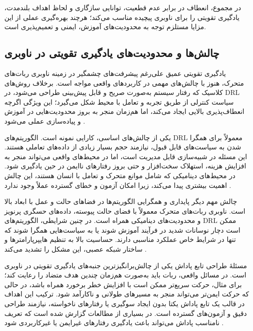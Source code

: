 در مجموع، انعطاف در برابر عدم قطعیت، توانایی سازگاری و لحاظ اهداف بلندمدت، یادگیری تقویتی را برای ناوبری پیچیده مناسب می‌کند؛ هرچند بهره‌گیری عملی از این مزایا مستلزم توجه به محدودیت‌های آموزش، ایمنی و تعمیم‌پذیری است.
\subsection{چالش‌ها و محدودیت‌های یادگیری تقویتی در ناوبری}

یادگیری تقویتی عمیق علی‌رغم پیشرفت‌های چشمگیر در زمینه ناوبری ربات‌های متحرک، هنوز با چالش‌های مهمی در کاربردهای واقعی مواجه است. برخلاف روش‌های کلاسیک که رفتار سیستم به‌صورت صریح و قابل پیش‌بینی طراحی می‌شود، در DRL سیاست کنترلی از طریق تجربه و تعامل با محیط شکل می‌گیرد؛ این ویژگی اگرچه انعطاف‌پذیری بالایی ایجاد می‌کند، اما هم‌زمان منجر به بروز محدودیت‌هایی در آموزش و پیاده‌سازی عملی می‌شود %
\cite{Le2024DRLNavigationSurvey}.

یکی از چالش‌های اساسی، کارایی نمونه است. الگوریتم‌های DRL معمولاً برای همگرا شدن به سیاست‌های قابل قبول، نیازمند حجم بسیار زیادی از داده‌های تعاملی هستند. این مسئله در شبیه‌سازی قابل مدیریت است، اما در محیط‌های واقعی می‌تواند منجر به افزایش هزینه، استهلاک سخت‌افزار و حتی بروز رفتارهای ناایمن در حین یادگیری شود. در محیط‌های دینامیکی که شامل موانع متحرک و تعامل با انسان هستند، این چالش اهمیت بیشتری پیدا می‌کند، زیرا امکان آزمون و خطای گسترده عملاً وجود ندارد %
\cite{Le2024DRLNavigationSurvey}.

چالش مهم دیگر پایداری و همگرایی الگوریتم‌ها در فضاهای حالت و عمل با ابعاد بالا است. ناوبری ربات‌های متحرک معمولاً با فضای حالت پیوسته، داده‌های حسگری پرنویز و محدودیت‌های دینامیکی همراه است. در چنین شرایطی، الگوریتم‌های DRL ممکن است دچار نوسانات شدید در فرآیند آموزش شوند یا به سیاست‌هایی همگرا شوند که تنها در شرایط خاص عملکرد مناسبی دارند. حساسیت بالا به تنظیم هایپرپارامترها و ساختار شبکه عصبی، این مشکل را تشدید می‌کند %
\cite{Le2024DRLNavigationSurvey}.

مسئلهٔ طراحی تابع پاداش یکی از چالش‌برانگیزترین جنبه‌های یادگیری تقویتی در ناوبری است. در مسائل واقعی، ربات باید به‌صورت هم‌زمان چندین هدف متضاد را رعایت کند؛ برای مثال، حرکت سریع‌تر ممکن است با افزایش خطر برخورد همراه باشد، در حالی که حرکت ایمن‌تر می‌تواند منجر به مسیرهای طولانی و ناکارآمد شود. ترکیب این اهداف در قالب یک تابع پاداش یکتا بدون ایجاد سوگیری یا رفتارهای ناخواسته، نیازمند طراحی دقیق و آزمون‌های گسترده است. در بسیاری از مطالعات گزارش شده است که تعریف نامناسب پاداش می‌تواند باعث یادگیری رفتارهای غیرایمن یا غیرکاربردی شود %
\cite{Le2024DRLNavigationSurvey}.

